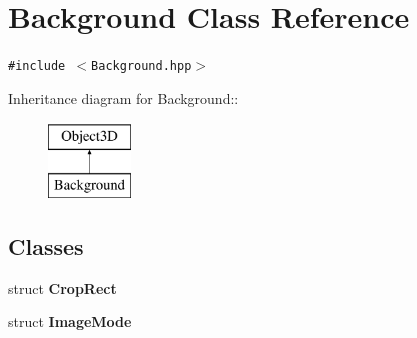 \hypertarget{classm3g_1_1Background}{
\section{Background Class Reference}
\label{classm3g_1_1Background}
}
{\tt \#include $<$Background.hpp$>$}

Inheritance diagram for Background::\begin{figure}[H]
\begin{center}
\leavevmode
\includegraphics[height=2cm]{classm3g_1_1Background}
\end{center}
\end{figure}
\subsection*{Classes}
\begin{CompactItemize}
\item 
struct \textbf{CropRect}
\item 
struct \textbf{ImageMode}
\end{CompactItemize}
